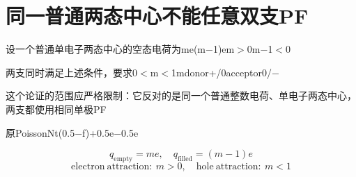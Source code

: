 \section{{\cjkfont 同一普通两态中心不能任意双支}\allowbreak{}PF}\label{sec:17}
{\cjkfont 设一个普通单电子两态中心的空态电荷为}\allowbreak{}me\allowbreak{}(m−1)e\allowbreak{}m\ensuremath{>}0\allowbreak{}m−1\ensuremath{<}0\allowbreak{}
\par
{\cjkfont 两支同时满足上述条件，要求}\allowbreak{}0\ensuremath{<}m\ensuremath{<}1\allowbreak{}m\allowbreak{}donor\allowbreak{}+/0\allowbreak{}acceptor\allowbreak{}0/−\allowbreak{}
\par
{\cjkfont 这个论证的范围应严格限制：它反对的是同一个普通整数电荷、单电子两态中心，两支都使用相同单极}\allowbreak{}PF\allowbreak{}
\par
{\cjkfont 原}\allowbreak{}Poisson\allowbreak{}Nt(0.5−f)\allowbreak{}+0.5e\allowbreak{}−0.5e\allowbreak{}
\par
\begin{equation}
q_{\mathrm{empty}}=me,\quad q_{\mathrm{filled}}=(m-1)e
\label{eq:18}\end{equation}
\begin{equation}
\mathrm{electron\ attraction}:\ m>0,\quad\mathrm{hole\ attraction}:\ m<1
\label{eq:19}\end{equation}
